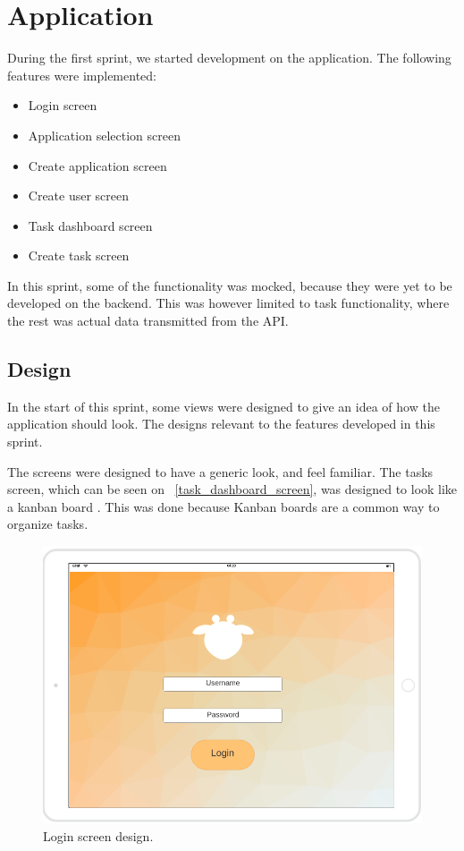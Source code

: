 \section{Application}
During the first sprint, we started development on the application.
The following features were implemented:
\begin{itemize}
    \item Login screen
    \item Application selection screen
    \item Create application screen
    \item Create user screen
    \item Task dashboard screen
    \item Create task screen
\end{itemize}

In this sprint, some of the functionality was mocked, because they were yet to be developed on the backend.
This was however limited to task functionality, where the rest was actual data transmitted from the API.

\subsection{Design}
\label{sprint_1_design}
In the start of this sprint, some views were designed to give an idea of how the application should look.
The designs relevant to the features developed in this sprint.

The screens were designed to have a generic look, and feel familiar.
The tasks screen, which can be seen on ~\autoref{task_dashboard_screen}, was designed to look like a kanban board \cite{kanbanBoard}.
This was done because Kanban boards are a common way to organize tasks.

\begin{figure}[H]
    \includegraphics[width=\textwidth]{Sprint_1/images/login_screen.png}
    \caption{Login screen design.}
    \label{login_screen_design}
\end{figure}

